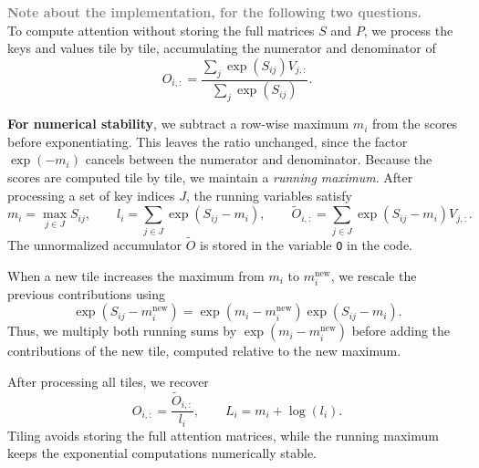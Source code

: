 \documentclass{article}
\theoremstyle{definition}
\theoremstyle{remark}
\begin{document}
\begin{boxC}
    \textbf{\textcolor{gray}{Note about the implementation, for the following two questions.}} \\
    
    To compute attention without storing the full matrices $S$ and $P$,
    we process the keys and values tile by tile, accumulating the numerator
    and denominator of
    \[
    O_{i,:}
    =
    \frac{\sum_j \exp(S_{ij})V_{j,:}}
            {\sum_j \exp(S_{ij})}.
    \]
    
    \textbf{For numerical stability}, we subtract a row-wise maximum $m_i$
    from the scores before exponentiating. This leaves the ratio
    unchanged, since the factor $\exp(-m_i)$ cancels between the
    numerator and denominator. Because the scores are computed tile by tile, we maintain a
    \emph{running maximum}. After processing a set of key indices $J$,
    the running variables satisfy
    \[
    m_i = \max_{j\in J} S_{ij},
    \qquad
    l_i = \sum_{j\in J} \exp(S_{ij}-m_i),
    \qquad
    \widetilde{O}_{i,:}
    = \sum_{j\in J} \exp(S_{ij}-m_i)V_{j,:}.
    \]
    The unnormalized accumulator $\widetilde{O}$ is stored in the
    variable \texttt{O} in the code.
    
    When a new tile increases the maximum from $m_i$ to
    $m_i^{\mathrm{new}}$, we rescale the previous contributions using
    \[
    \exp(S_{ij}-m_i^{\mathrm{new}})
    =
    \exp(m_i-m_i^{\mathrm{new}})\exp(S_{ij}-m_i).
    \]
    Thus, we multiply both running sums by
    $\exp(m_i-m_i^{\mathrm{new}})$ before adding the contributions
    of the new tile, computed relative to the new maximum.
    
    After processing all tiles, we recover
    \[
    O_{i,:} = \frac{\widetilde{O}_{i,:}}{l_i},
    \qquad
    L_i = m_i+\log(l_i).
    \]
    Tiling avoids storing the full attention matrices, while the
    running maximum keeps the exponential computations numerically stable.
\end{boxC}
\end{document}
